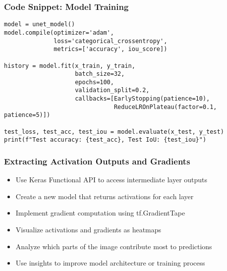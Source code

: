 \begin{frame}[fragile]\frametitle{Code Snippet: Model Training}
\begin{lstlisting}
model = unet_model()
model.compile(optimizer='adam', 
              loss='categorical_crossentropy', 
              metrics=['accuracy', iou_score])

history = model.fit(x_train, y_train,
                    batch_size=32,
                    epochs=100,
                    validation_split=0.2,
                    callbacks=[EarlyStopping(patience=10),
                               ReduceLROnPlateau(factor=0.1, patience=5)])

test_loss, test_acc, test_iou = model.evaluate(x_test, y_test)
print(f"Test accuracy: {test_acc}, Test IoU: {test_iou}")
\end{lstlisting}
\end{frame}

\begin{frame}[fragile]\frametitle{Extracting Activation Outputs and Gradients}
\begin{itemize}
\item Use Keras Functional API to access intermediate layer outputs
\item Create a new model that returns activations for each layer
\item Implement gradient computation using tf.GradientTape
\item Visualize activations and gradients as heatmaps
\item Analyze which parts of the image contribute most to predictions
\item Use insights to improve model architecture or training process
\end{itemize}
\end{frame}

